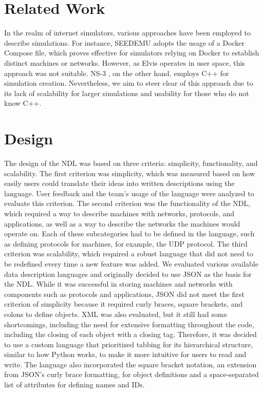 \documentclass[journal]{IEEEtran} %
\begin{document}
\section{Related Work}

In the realm of internet simulators, various approaches have been employed to describe simulations. For instance, SEEDEMU \cite{seedemu} adopts the usage of a Docker Compose file, which proves effective for simulators relying on Docker to establish distinct machines or networks. However, as Elvis operates in user space, this approach was not suitable. NS-3 \cite{ns3}, on the other hand, employs C++ for simulation creation. Nevertheless, we aim to steer clear of this approach due to its lack of scalability for larger simulations and usability for those who do not know C++.

\section{Design}
The design of the NDL was based on three criteria: simplicity, functionality, and scalability. The first criterion was simplicity, which was measured based on how easily users could translate their ideas into written descriptions using the language. User feedback and the team's usage of the language were analyzed to evaluate this criterion. The second criterion was the functionality of the NDL, which required a way to describe machines with networks, protocols, and applications, as well as a way to describe the networks the machines would operate on. Each of these subcategories had to be defined in the language, such as defining protocols for machines, for example, the UDP protocol. The third criterion was scalability, which required a robust language that did not need to be redefined every time a new feature was added.
We evaluated various available data description languages and originally decided to use JSON as the basis for the NDL. While it was successful in storing machines and networks with components such as protocols and applications, JSON did not meet the first criterion of simplicity because it required curly braces, square brackets, and colons to define objects. XML was also evaluated, but it still had some shortcomings, including the need for extensive formatting throughout the code, including the closing of each object with a closing tag. Therefore, it was decided to use a custom language that prioritized tabbing for its hierarchical structure, similar to how Python works, to make it more intuitive for users to read and write. The language also incorporated the square bracket notation, an extension from JSON’s curly brace formatting, for object definitions and a space-separated list of attributes for defining names and IDs.
\end{document}
